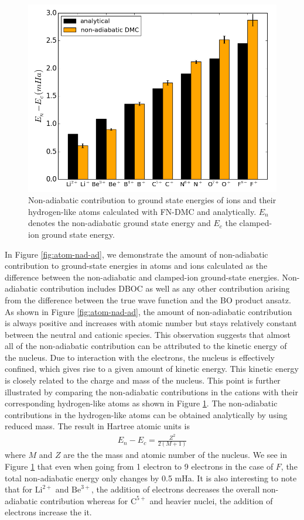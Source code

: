 \documentclass[pra,superscriptaddress,groupedaddress,twocolumn]{revtex4}
\begin{document}
\begin{figure}[h]
\includegraphics[scale=.4]{Figures/analytical}
\caption{Non-adiabatic contribution to ground state energies of ions and their hydrogen-like atoms calculated with FN-DMC and analytically. $E_n$ denotes the non-adiabatic ground state energy and $E_c$ the clamped-ion ground state energy. \label{fig:analytical}}
\end{figure}

In Figure \ref{fig:atom-nad-ad}, we demonstrate the amount of non-adiabatic contribution to ground-state energies in atoms and ions calculated as the difference between the non-adiabatic and clamped-ion ground-state energies. Non-adiabatic contribution includes DBOC as well as any other contribution arising from the difference between the true wave function and the BO product ansatz. As shown in Figure \ref{fig:atom-nad-ad}, the amount of non-adiabatic contribution is always positive and increases with atomic number but stays relatively constant between the neutral and cationic species. This observation suggests that almost all of the non-adiabatic contribution can be attributed to the kinetic energy of the nucleus. Due to interaction with the electrons, the nucleus is effectively confined, which gives rise to a given amount of kinetic energy. This kinetic energy is closely related to the charge and mass of the nucleus. This point is further illustrated by comparing the non-adiabatic contributions in the cations with their corresponding hydrogen-like atoms as shown in Figure \ref{fig:analytical}. The non-adiabatic contributions in the hydrogen-like atoms can be obtained analytically by using reduced mass. The result in Hartree atomic units is
\begin{align}
E_n-E_c=\frac{Z^2}{2(M+1)}
\end{align}
where $M$ and $Z$ are the the mass and atomic number of the nucleus. We see in Figure \ref{fig:analytical} that even when going from 1 electron to 9 electrons in the case of $F$, the total non-adiabatic energy only changes by 0.5 mHa. It is also interesting to note that for $\text{Li}^{2+}$ and $\text{Be}^{3+}$, the addition of electrons decreases the overall non-adiabatic contribution whereas for $\text{C}^{5+}$ and heavier nuclei, the addition of electrons increase the it.
\end{document}
